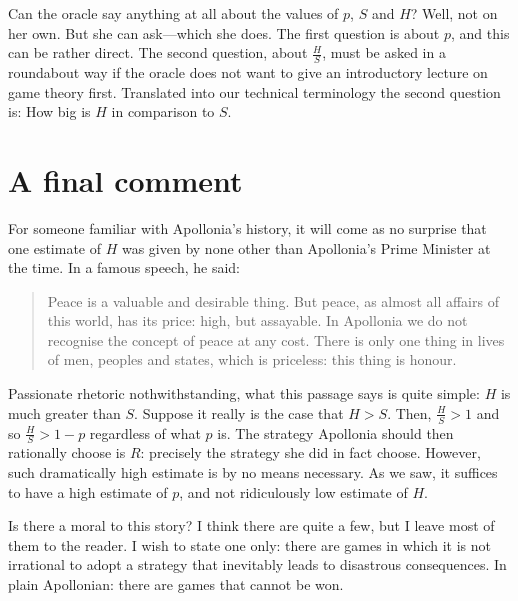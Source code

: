 \documentclass{amsart}
\begin{document}
\bigskip
Can the oracle say anything at all about the values of $p$, $S$ and $H$? Well,
not on her own. But she can ask---which she does. The first question is about
$p$, and this can be rather direct. The second question, about $\frac{H}{S}$, 
must be asked in a roundabout way if the oracle does not want to
give an introductory lecture on game theory first. 
Translated into our technical terminology the second question is: 
How big is $H$ in comparison to $S$.


\section{A final comment}


For someone familiar with Apollonia's history,
it will come as no surprise that one estimate of $H$ was given by 
none other than Apollonia's Prime Minister at the time. In a famous speech, he
said: 
\begin{quote}
Peace is a valuable and desirable thing. But peace, as almost all affairs of
this world, has its price: high, but assayable. In Apollonia we do not recognise  
the concept of peace at any cost. There is only one thing in lives of
men, peoples and states, which is priceless: this thing is honour.
\end{quote}
Passionate rhetoric nothwithstanding, what this passage says is quite simple:
$H$ is much greater than $S$. Suppose it really is the case that $H>S$. Then, 
$\frac{H}{S} > 1$ and so $\frac{H}{S} > 1-p$ regardless of what $p$ is.
The strategy Apollonia should then rationally choose is $R$: precisely the
strategy she did in fact choose.  However, such dramatically high estimate is by
no means necessary. As we saw, it suffices to have a high estimate of $p$, and
not ridiculously low estimate of $H$.  


\bigskip
Is there a moral to this story? I think there are quite a few, but I leave most
of them to the reader. I wish to state one only: there are games in which it is
not irrational to adopt a strategy that inevitably leads to disastrous
consequences. In plain Apollonian: there are games that cannot be won.
\end{document}
